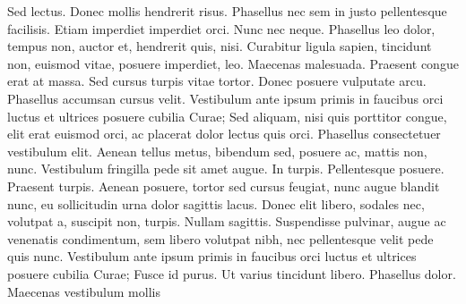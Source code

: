 Sed lectus. Donec mollis hendrerit risus. Phasellus nec sem in justo pellentesque facilisis. Etiam imperdiet imperdiet orci. Nunc nec neque. Phasellus leo dolor, tempus non, auctor et, hendrerit quis, nisi. Curabitur ligula sapien, tincidunt non, euismod vitae, posuere imperdiet, leo. Maecenas malesuada. Praesent congue erat at massa. Sed cursus turpis vitae tortor. Donec posuere vulputate arcu. Phasellus accumsan cursus velit. Vestibulum ante ipsum primis in faucibus orci luctus et ultrices posuere cubilia Curae; Sed aliquam, nisi quis porttitor congue, elit erat euismod orci, ac placerat dolor lectus quis orci. Phasellus consectetuer vestibulum elit. Aenean tellus metus, bibendum sed, posuere ac, mattis non, nunc. Vestibulum fringilla pede sit amet augue. In turpis. Pellentesque posuere. Praesent turpis. Aenean posuere, tortor sed cursus feugiat, nunc augue blandit nunc, eu sollicitudin urna dolor sagittis lacus. Donec elit libero, sodales nec, volutpat a, suscipit non, turpis. Nullam sagittis. Suspendisse pulvinar, augue ac venenatis condimentum, sem libero volutpat nibh, nec pellentesque velit pede quis nunc. Vestibulum ante ipsum primis in faucibus orci luctus et ultrices posuere cubilia Curae; Fusce id purus. Ut varius tincidunt libero. Phasellus dolor. Maecenas vestibulum mollis

\endgroup